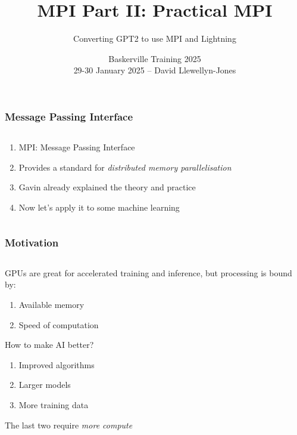 \documentclass[
	notes=none,
	aspectratio=169
]{beamer}
\begin{document}
\title{MPI Part II: Practical MPI}
\subtitle{Converting GPT2 to use MPI and Lightning}
\author{Baskerville Training 2025\\29-30 January 2025 -- David Llewellyn-Jones}


\renewcommand{\thefootnote}{\arabic{footnote}}

\frame{
\titlepage
}
\note{
}

\renewcommand{\thefootnote}{\fnsymbol{footnote}}


\begin{frame}
\frametitle{Message Passing Interface}

\begin{columns}[T]
\begin{column}[T]{1.0\textwidth}
\setlength{\parskip}{0.5em}

\vspace{-0.5cm}
\begin{enumerate}
\setlength{\parskip}{0.5em}
\item MPI: Message Passing Interface
\item Provides a standard for {\it distributed memory parallelisation}
\item Gavin already explained the theory and practice
\item Now let's apply it to some machine learning
\end{enumerate}

\end{column}
\end{columns}

\end{frame}
\note{
}


\begin{frame}
\frametitle{Motivation}

\begin{columns}[T]
\begin{column}[T]{1.0\textwidth}
\setlength{\parskip}{0.5em}

\vspace{-0.5cm}
GPUs are great for accelerated training and inference, but processing is bound by:
\begin{enumerate}
\setlength{\parskip}{0.5em}
\item Available memory
\item Speed of computation
\end{enumerate}
How to make AI better?
\begin{enumerate}
\item Improved algorithms
\item Larger models
\item More training data
\end{enumerate}
The last two require {\it more compute}

\end{column}
\end{columns}

\end{frame}
\note{
}
\end{document}
